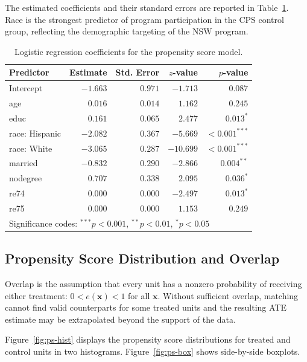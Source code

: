 \documentclass[12pt, a4paper]{article}
\begin{document}
The estimated coefficients and their standard errors are reported in Table~\ref{tab:ps-coefs}. Race is the strongest predictor of program participation in the CPS control group, reflecting the demographic targeting of the NSW program.

\begin{table}[H]
  \centering
  \caption{Logistic regression coefficients for the propensity score model.}
  \label{tab:ps-coefs}
  \begin{tabular}{lrrrr}
    \toprule
    \textbf{Predictor} & \textbf{Estimate} & \textbf{Std. Error} & \textbf{$z$-value} & \textbf{$p$-value} \\
    \midrule
    Intercept        & $-1.663$ & $0.971$ & $-1.713$ & $0.087$ \\
    age              & $0.016$  & $0.014$ & $1.162$  & $0.245$ \\
    educ             & $0.161$  & $0.065$ & $2.477$  & $0.013^*$ \\
    race: Hispanic   & $-2.082$ & $0.367$ & $-5.669$ & $<0.001^{***}$ \\
    race: White      & $-3.065$ & $0.287$ & $-10.699$& $<0.001^{***}$ \\
    married          & $-0.832$ & $0.290$ & $-2.866$ & $0.004^{**}$ \\
    nodegree         & $0.707$  & $0.338$ & $2.095$  & $0.036^*$ \\
    re74             & $0.000$& $0.000$ & $-2.497$ & $0.013^*$ \\
    re75             & $0.000$  & $0.000$ & $1.153$  & $0.249$ \\
    \bottomrule
    \multicolumn{5}{l}{\footnotesize Significance codes: $^{***}p<0.001$, $^{**}p<0.01$, $^*p<0.05$}
  \end{tabular}
\end{table}

\subsection{Propensity Score Distribution and Overlap}

Overlap is the assumption that every unit has a nonzero probability of receiving either treatment: $0 < e(\mathbf{x}) < 1$ for all $\mathbf{x}$. Without sufficient overlap, matching cannot find valid counterparts for some treated units and the resulting ATE estimate may be extrapolated beyond the support of the data.

Figure~\ref{fig:ps-hist} displays the propensity score distributions for treated and control units in two histograms. Figure~\ref{fig:ps-box} shows side-by-side boxplots.
\end{document}
